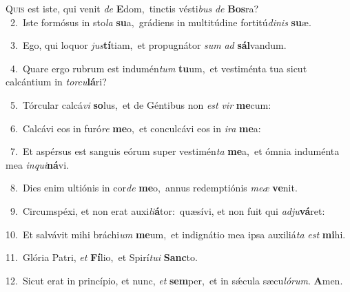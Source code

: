 \lettrine{\initial\textcolor{\initialcolor}{Q}}{uis} est iste, qui venit \textit{de} \textbf{E}\-dom,~\star tinctis vésti\textit{bus} \textit{de} \textbf{Bos}\-ra?\\
{\numbfont\textcolor{\numbcolor}{~2.}}~Iste formósus in sto\textit{la} \textbf{su}\-a,~\star grádiens in multitúdine fortitú\-\textit{di}\-\textit{nis} \textbf{su}\-æ.\par
{\numbfont\textcolor{\numbcolor}{~3.}}~Ego, qui loquor \textit{jus}\-\textbf{tí}tiam,~\star et propugnátor \textit{sum} \textit{ad} \textbf{sál}\-vandum.\par
{\numbfont\textcolor{\numbcolor}{~4.}}~Quare ergo rubrum est indumén\textit{tum} \textbf{tu}\-um,~\star et vestiménta tua sicut calcántium in \textit{tor}\-\textit{cu}\textbf{lá}ri?\par
{\numbfont\textcolor{\numbcolor}{~5.}}~Tórcular calcá\textit{vi} \textbf{so}\-lus,~\star et de Géntibus non \textit{est} \textit{vir} \textbf{me}\-cum:\par
{\numbfont\textcolor{\numbcolor}{~6.}}~Calcávi eos in furó\textit{re} \textbf{me}\-o,~\star et conculcávi eos in \textit{i}\-\textit{ra} \textbf{me}\-a:\par
{\numbfont\textcolor{\numbcolor}{~7.}}~Et aspérsus est sanguis eórum super vestimén\textit{ta} \textbf{me}\-a,~\star et ómnia induménta mea \textit{in}\-\textit{qui}\textbf{ná}vi.\par
{\numbfont\textcolor{\numbcolor}{~8.}}~Dies enim ultiónis in cor\textit{de} \textbf{me}\-o,~\star annus redemptiónis \textit{me}\-\textit{æ} \textbf{ve}\-nit.\par
{\numbfont\textcolor{\numbcolor}{~9.}}~Circumspéxi, et non erat auxi\-\textit{li}\-\textbf{á}tor:~\star quæsívi, et non fuit qui \textit{ad}\-\textit{ju}\textbf{vá}ret:\par
{\numbfont\textcolor{\numbcolor}{10.}}~Et salvávit mihi bráchi\textit{um} \textbf{me}\-um,~\star et indignátio mea ipsa auxiliá\textit{ta} \textit{est} \textbf{mi}\-hi.\par
{\numbfont\textcolor{\numbcolor}{11.}}~Glória Patri, \textit{et} \textbf{Fí}\-lio,~\star et Spirí\-\textit{tu}\-\textit{i} \textbf{Sanc}\-to.\par
{\numbfont\textcolor{\numbcolor}{12.}}~Sicut erat in princípio, et nunc, \textit{et} \textbf{sem}\-per,~\star et in sǽcula sæcu\-\textit{ló}\-\textit{rum}. \textbf{A}\-men.\par
